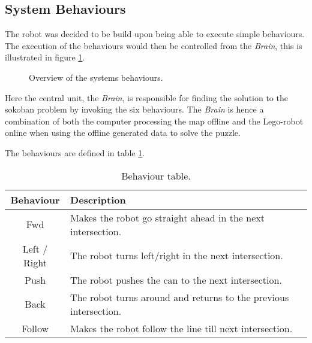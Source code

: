 \subsection{System Behaviours}
The robot was decided to be build upon being able to execute simple behaviours.
The execution of the behaviours would then be controlled from the \textit{Brain},
this is illustrated in figure \ref{fig:behaviourSystem}.

\begin{figure}[H]
\center
{}
\caption{Overview of the systems behaviours.}
\label{fig:behaviourSystem}
\end{figure}

Here the central unit, the \textit{Brain}, is responsible for finding the solution to the sokoban problem by invoking the six behaviours.
The \textit{Brain} is hence a combination of both the computer processing the map offline and the Lego-robot online when using the offline generated data to solve the puzzle.

The behaviours are defined in table \ref{tab:behaviourExplained}.
\begin{table}[H]
\center
\begin{tabular}{c|l}
Behaviour & Description \\ \hline
Fwd & Makes the robot go straight ahead in the next intersection. \\
Left / Right & The robot turns left/right in the next intersection. \\
Push & The robot pushes the can to the next intersection. \\
Back & The robot turns around and returns to the previous intersection. \\
Follow & Makes the robot follow the line till next intersection.
\end{tabular}
\caption{Behaviour table.}
\label{tab:behaviourExplained}
\end{table}

